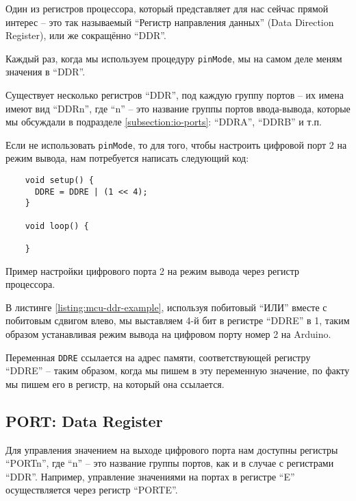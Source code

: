 \documentclass[../sparc.tex]{subfiles}
\begin{document}
Один из регистров процессора, который представляет для нас сейчас прямой интерес
-- это так называемый ``Регистр направления данных'' (Data Direction Register),
или же сокращённо ``DDR''.

Каждый раз, когда мы используем процедуру \texttt{pinMode}, мы на самом
деле меням значения в ``DDR''.

Существует несколько регистров ``DDR'', под каждую группу портов -- их имена
имеют вид ``DDRn'', где ``n'' -- это название группы портов ввода-вывода, которые
мы обсуждали в подразделе \ref{subsection:io-ports}: ``DDRA'', ``DDRB'' и т.п.

Если не использовать \texttt{pinMode}, то для того, чтобы настроить
цифровой порт 2 на режим вывода, нам потребуется написать следующий код:

\begin{listing}[H]
  \begin{verbatim}
    void setup() {
      DDRE = DDRE | (1 << 4);
    }

    void loop() {

    }
  \end{verbatim}
  \caption{Пример настройки цифрового порта 2 на режим вывода через регистр
    процессора.}
  \label{listing:mcu-ddr-example}
\end{listing}

В листинге \ref{listing:mcu-ddr-example}, используя побитовый ``ИЛИ'' вместе с
побитовым сдвигом влево, мы выставляем 4-й бит в регистре ``DDRE'' в 1, таким
образом устанавливая режим вывода на цифровом порту номер 2 на Arduino.

Переменная \texttt{DDRE} ссылается на адрес памяти, соответствующей
регистру ``DDRE'' -- таким образом, когда мы пишем в эту переменную значение, по
факту мы пишем его в регистр, на который она ссылается.

\subsection{PORT: Data Register}

Для управления значением на выходе цифрового порта нам доступны регистры
``PORTn'', где ``n'' -- это название группы портов, как и в случае с регистрами
``DDR''.  Например, управление значениями на портах в регистре ``E''
осуществляется через регистр ``PORTE''.
\end{document}

